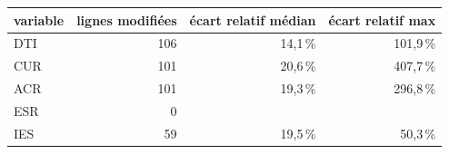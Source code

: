 \begin{tabular}{lrrr}
\toprule
\textbf{variable} & \textbf{lignes modifiées} & \textbf{écart relatif médian} & \textbf{écart relatif max} \\
\midrule
DTI & 106 & 14,1\,\% & 101,9\,\% \\
CUR & 101 & 20,6\,\% & 407,7\,\% \\
ACR & 101 & 19,3\,\% & 296,8\,\% \\
ESR & 0 &  &  \\
IES & 59 & 19,5\,\% & 50,3\,\% \\
\bottomrule
\end{tabular}
